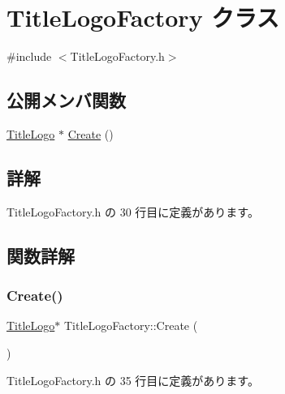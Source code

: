 \hypertarget{class_title_logo_factory}{}\section{Title\+Logo\+Factory クラス}
\label{class_title_logo_factory}


{\ttfamily \#include $<$Title\+Logo\+Factory.\+h$>$}

\subsection*{公開メンバ関数}
\begin{DoxyCompactItemize}
\item 
\mbox{\hyperlink{class_title_logo}{Title\+Logo}} $\ast$ \mbox{\hyperlink{class_title_logo_factory_acbd10f361541910e9c0cee26770f0150}{Create}} ()
\end{DoxyCompactItemize}


\subsection{詳解}


 Title\+Logo\+Factory.\+h の 30 行目に定義があります。



\subsection{関数詳解}
\mbox{\label{class_title_logo_factory_acbd10f361541910e9c0cee26770f0150}} 
\subsubsection{\texorpdfstring{Create()}{Create()}}
{\footnotesize\ttfamily \mbox{\hyperlink{class_title_logo}{Title\+Logo}}$\ast$ Title\+Logo\+Factory\+::\+Create (\begin{DoxyParamCaption}{ }\end{DoxyParamCaption})\hspace{0.3cm}{\ttfamily [inline]}}



 Title\+Logo\+Factory.\+h の 35 行目に定義があります。

